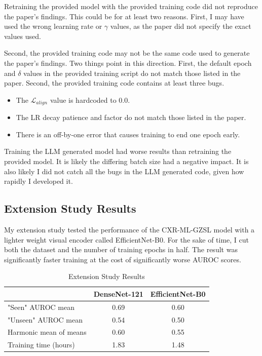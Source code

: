 \documentclass[letterpaper]{article} %
\begin{document}
Retraining the provided model with the provided training code did not reproduce the paper's findings. This could be for at least two reasons. First, I may have used the wrong learning rate or $\gamma$ values, as the paper did not specify the exact values used.

Second, the provided training code may not be the same code used to generate the paper's findings. Two things point in this direction. First, the default epoch and $\delta$ values in the provided training script do not match those listed in the paper. Second, the provided training code contains at least three bugs.

\begin{itemize}
    \item The \texorpdfstring{$\mathcal{L}_{align}$}: value is hardcoded to 0.0.
    \item The LR decay patience and factor do not match those listed in the paper.
    \item There is an off-by-one error that causes training to end one epoch early.
\end{itemize}

Training the LLM generated model had worse results than retraining the provided model. It is likely the differing batch size had a negative impact. It is also likely I did not catch all the bugs in the LLM generated code, given how rapidly I developed it.

\subsection{Extension Study Results}

My extension study tested the performance of the CXR-ML-GZSL model with a lighter weight visual encoder called EfficientNet-B0. For the sake of time, I cut both the dataset and the number of training epochs in half. The result was significantly faster training at the cost of significantly worse AUROC scores.

\begin{table}[h!]
\centering
\begin{tabular}{|l|c|c|}
\hline
\textbf{} & \textbf{DenseNet-121} & \textbf{EfficientNet-B0} \\
\hline
"Seen" AUROC mean      & 0.69 & 0.60 \\
"Unseen" AUROC mean    & 0.54 & 0.50 \\
Harmonic mean of means & 0.60 & 0.55 \\
Training time (hours)  & 1.83 & 1.48 \\
\hline
\end{tabular}
\caption{Extension Study Results}
\label{tab:extension}
\end{table}
\end{document}
